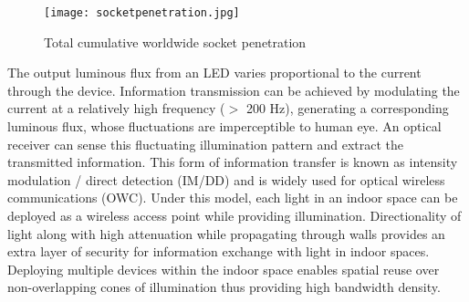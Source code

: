 \begin{figure}[!t]
	\centering
		\texttt{[image: socketpenetration.jpg]}
	\caption{Total cumulative worldwide socket penetration}
	\label{fig:socketpenetration}
\end{figure}

The output luminous flux from an LED varies proportional to the current through the device. Information transmission can be achieved by modulating the current at a relatively high frequency ($>$ 200 Hz), generating a corresponding luminous flux, whose fluctuations are imperceptible to human eye. An optical receiver can sense this fluctuating illumination pattern and extract the transmitted information. This form of information transfer is known as intensity modulation / direct detection (IM/DD) and is widely used for optical wireless communications (OWC). Under this model, each light in an indoor space can be deployed as a wireless access point while providing illumination. Directionality of light along with high attenuation while propagating through walls provides an extra layer of security for information exchange with light in indoor spaces. Deploying multiple devices within the indoor space enables spatial reuse over non-overlapping cones of illumination thus providing high bandwidth density.
